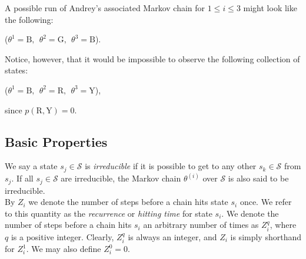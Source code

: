 \documentclass[12pt,twoside]{reedthesis}
\begin{document}
	A possible run of Andrey's associated Markov chain for $1 \leq i \leq 3$ might look like the following:
	\begin{center}
		($\theta^{1} = \textrm{B},\ \  \theta^{2} = \textrm{G},\ \ \theta^{3} = \textrm{B}$).
	\end{center}
	Notice, however, that it would be impossible to observe the following collection of states:
	\begin{center}
		($\theta^{1} = \textrm{B},\ \ \theta^{2} = \textrm{R},\ \  \theta^{3} = \textrm{Y}$),
	\end{center}
	since $p(\textrm{R}, \textrm{Y}) = 0$.

		\subsection*{Basic Properties}
		We say a state $s_j \in \mathcal{S}$ is {\em irreducible} if it is possible to get to any other $s_k \in \mathcal{S}$ from $s_j$. If all $s_j \in \mathcal{S}$ are irreducible, the Markov chain $\theta^{(i)}$ over $\mathcal{S}$ is also said to be irreducible. \\
		
		By $Z_i$ we denote the number of steps before a chain hits state $s_i$ once. 
		We refer to this quantity as the {\em recurrence} or {\em hitting time} for state $s_i$.
		We denote the number of steps before a chain hits $s_i$ an arbitrary number of times as $Z^{q}_i$, where $q$ is a positive integer. Clearly, $Z^{q}_i$ is always an integer, and $Z_i$ is simply shorthand for $Z^{1}_i$. We may also define $Z^{0}_i = 0$. \\
		
\end{document}
